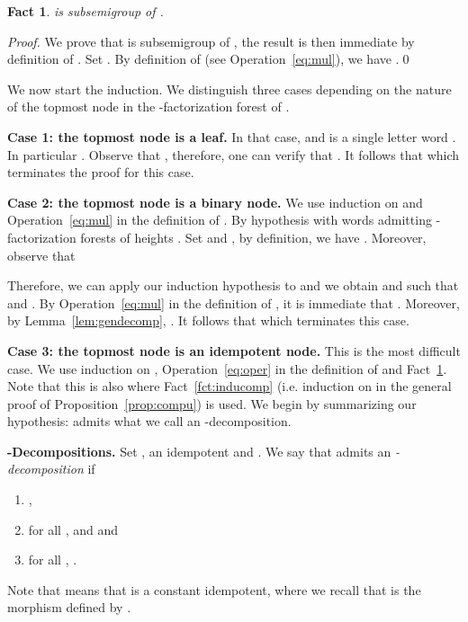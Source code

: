 \documentclass[envcountsame]{llncs}
\newtheorem{fact}[theorem]{Fact}
\begin{document}
\begin{fact} \label{fct:semig}
   is subsemigroup of .
\end{fact}

\begin{proof}
  We prove that  is subsemigroup of
  , the result is then immediate by definition of .
  Set . By definition
  of  (see Operation~\eqref{eq:mul}), we have .\qed
\end{proof}

We now start the induction. We distinguish three cases depending on
the nature of the topmost node in the -factorization forest of
.

\medskip
\noindent
{\bf Case 1: the topmost node is a leaf.} In that case,  and
 is a single letter word . In particular . Observe that , therefore, one can verify that
. It follows that
 which terminates the proof for this  
case.

\medskip
\noindent
{\bf Case 2: the topmost node is a binary node.} We use induction on
 and Operation~\eqref{eq:mul} in the definition of . By
hypothesis  with  words admitting 
-factorization forests of heights . Set  and , by definition,
we have . Moreover, observe that

Therefore, we can apply our induction hypothesis to  and we
obtain  and  such that  and . By
Operation~\eqref{eq:mul} in the definition of , it is immediate
that . Moreover, by Lemma~\ref{lem:gendecomp}, . It follows that  which terminates this case.


\medskip
\noindent
{\bf Case 3: the topmost node is an idempotent node.} This is the 
most difficult case. We use induction on ,
Operation~\eqref{eq:oper} in the definition of  and
Fact~\ref{fct:semig}. Note that this is also where
Fact~\ref{fct:inducomp} (i.e. induction on  in the general proof of
Proposition~\ref{prop:compu}) is used. We begin by summarizing our
hypothesis:  admits what we call an -decomposition.

\medskip
\noindent
{\bf -Decompositions.} Set ,  an idempotent and . We
say that  admits an \emph{-decomposition} 
if
\begin{enumerate}[label=,ref=\alph*]
\item\label{item:1} ,
\item\label{item:2} for all ,  and
   and
\item\label{item:3} for all , .
\end{enumerate}
Note that  means that  is a constant idempotent, where we recall that  is the morphism defined by .
\end{document}
